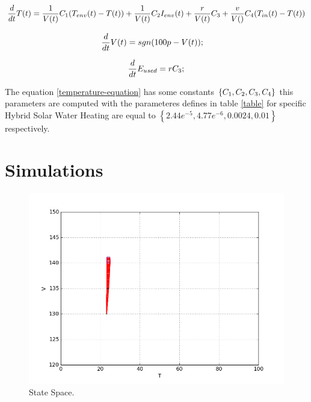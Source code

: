 

\begin{equation}
\frac{d}{dt}T(t) =   \frac{1}{V(t)}  C_1(T_{env}(t)-T(t))+ \frac{1}{V(t)} C_{2}I_{env}(t)+  \frac{r}{V(t)} C_{3} +  \frac{v}{V()} C_{4}(T_{in}(t)-T(t))
\label{temperature-equation}
\end{equation}

\begin{equation}
\frac{d}{dt}V(t) = sgn(100p - V(t)); \quad
\label{volume-equation}
\end{equation}

\begin{equation} 
\frac{d}{dt}E_{used} =  r C_{3} ;
\label{Energy-equation}
\end{equation}

The equation \ref{temperature-equation} has some constants $\left\lbrace 
C_1, C_{2}, C_{3}, C_{4} \right\rbrace $ this
parameters are computed with the parameteres defines in table \ref{table} for specific Hybrid Solar Water Heating
are equal to $\left\lbrace 2.44e^{-5},  4.77e^{-6}
, 0.0024, 0.01  \right\rbrace$ respectively.


\section{Simulations}


\begin{figure}
    \includegraphics[width=\linewidth]{1}
    \caption{State Space.}
    \label{fig:1}
\end{figure}


